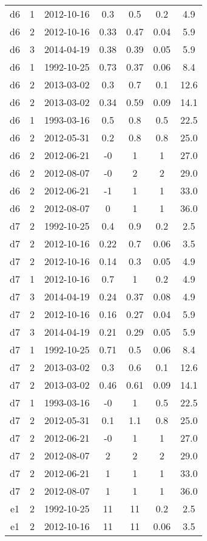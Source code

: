 \begin{table*}[htp]
\begin{tabular}{ccccccc}
d6 & 1 & 2012-10-16 & 0.3 & 0.5 & 0.2 & 4.9 \\
d6 & 2 & 2012-10-16 & 0.33 & 0.47 & 0.04 & 5.9 \\
d6 & 3 & 2014-04-19 & 0.38 & 0.39 & 0.05 & 5.9 \\
d6 & 1 & 1992-10-25 & 0.73 & 0.37 & 0.06 & 8.4 \\
d6 & 2 & 2013-03-02 & 0.3 & 0.7 & 0.1 & 12.6 \\
d6 & 2 & 2013-03-02 & 0.34 & 0.59 & 0.09 & 14.1 \\
d6 & 1 & 1993-03-16 & 0.5 & 0.8 & 0.5 & 22.5 \\
d6 & 2 & 2012-05-31 & 0.2 & 0.8 & 0.8 & 25.0 \\
d6 & 2 & 2012-06-21 & -0 & 1 & 1 & 27.0 \\
d6 & 2 & 2012-08-07 & -0 & 2 & 2 & 29.0 \\
d6 & 2 & 2012-06-21 & -1 & 1 & 1 & 33.0 \\
d6 & 2 & 2012-08-07 & 0 & 1 & 1 & 36.0 \\
d7 & 2 & 1992-10-25 & 0.4 & 0.9 & 0.2 & 2.5 \\
d7 & 2 & 2012-10-16 & 0.22 & 0.7 & 0.06 & 3.5 \\
d7 & 2 & 2012-10-16 & 0.14 & 0.3 & 0.05 & 4.9 \\
d7 & 1 & 2012-10-16 & 0.7 & 1 & 0.2 & 4.9 \\
d7 & 3 & 2014-04-19 & 0.24 & 0.37 & 0.08 & 4.9 \\
d7 & 2 & 2012-10-16 & 0.16 & 0.27 & 0.04 & 5.9 \\
d7 & 3 & 2014-04-19 & 0.21 & 0.29 & 0.05 & 5.9 \\
d7 & 1 & 1992-10-25 & 0.71 & 0.5 & 0.06 & 8.4 \\
d7 & 2 & 2013-03-02 & 0.3 & 0.6 & 0.1 & 12.6 \\
d7 & 2 & 2013-03-02 & 0.46 & 0.61 & 0.09 & 14.1 \\
d7 & 1 & 1993-03-16 & -0 & 1 & 0.5 & 22.5 \\
d7 & 2 & 2012-05-31 & 0.1 & 1.1 & 0.8 & 25.0 \\
d7 & 2 & 2012-06-21 & -0 & 1 & 1 & 27.0 \\
d7 & 2 & 2012-08-07 & 2 & 2 & 2 & 29.0 \\
d7 & 2 & 2012-06-21 & 1 & 1 & 1 & 33.0 \\
d7 & 2 & 2012-08-07 & 1 & 1 & 1 & 36.0 \\
e1 & 2 & 1992-10-25 & 11 & 11 & 0.2 & 2.5 \\
e1 & 2 & 2012-10-16 & 11 & 11 & 0.06 & 3.5 \\

\end{tabular}
\end{table*}
